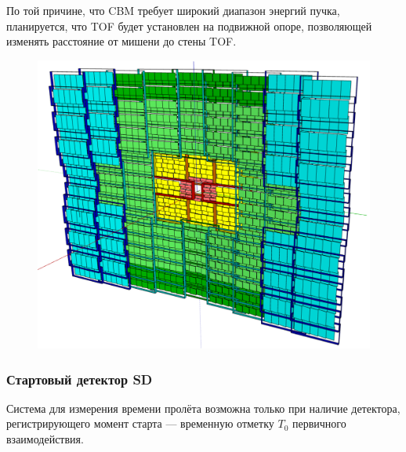 По той причине, что CBM требует широкий диапазон энергий пучка, планируется, что TOF будет установлен на подвижной опоре, позволяющей изменять расстояние от мишени до стены TOF.


\begin{figure}[H]
\includegraphics[width=1.0\textwidth]{pictures/TOF.png}
\caption{}
\label{fig:TOF}
\end{figure}

\subsubsection{Стартовый детектор SD}\label{sec:secSD}

Система для измерения времени пролёта возможна только при наличие детектора, регистрирующего момент старта --- временную отметку $T_{0}$ первичного взаимодействия.


